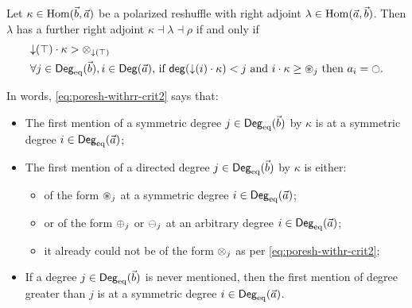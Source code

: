 \documentclass[a4paper]{memoir}
\begin{document}
\begin{theorem} \label{thm:poresh-withrr}
	Let $\kappa \in {\mathrm{Hom}}(\vec b, \vec a)$ be a polarized reshuffle with right adjoint $\lambda \in {\mathrm{Hom}}(\vec a, \vec b)$.
	Then $\lambda$ has a further right adjoint $\kappa \dashv \lambda \dashv \rho$ if and only if
	\begin{align}
		&\predeg(\top) \cdot \kappa > \mixpol_{\predeg(\top)} \label{eq:poresh-withrr-crit1} \\
		&\text{$\forall j \in \Degeq(\vec b), i \in \Deg(\vec a)$, if $\getdeg(\predeg(i) \cdot \kappa) < j$ and $i \cdot \kappa \geq \isopol_j$ then $a_i = \npolar$.} \label{eq:poresh-withrr-crit2}
	\end{align}
\end{theorem}
In words, \cref{eq:poresh-withrr-crit2} says that:
\begin{itemize}
	\item The first mention of a symmetric degree $j \in {\mathsf{Deg}_{\mathrm{eq}}}(\vec b)$ by $\kappa$ is at a symmetric degree $i \in {\mathsf{Deg}_{\mathrm{eq}}}(\vec a)$;
	\item The first mention of a directed degree $j \in {\mathsf{Deg}_{\mathrm{eq}}}(\vec b)$ by $\kappa$ is either:
	\begin{itemize}
		\item of the form ${\oast}_j$ at a symmetric degree $i \in {\mathsf{Deg}_{\mathrm{eq}}}(\vec a)$;
		\item or of the form ${\oplus}_j$ or ${\ominus}_j$ at an arbitrary degree $i \in {\mathsf{Deg}_{\mathrm{eq}}}(\vec a)$;
		\item it already could not be of the form ${\otimes}_j$ as per \cref{eq:poresh-withr-crit2};
	\end{itemize}
	\item If a degree $j \in {\mathsf{Deg}_{\mathrm{eq}}}(\vec b)$ is never mentioned, then the first mention of degree greater than $j$ is at a symmetric degree $i \in {\mathsf{Deg}_{\mathrm{eq}}}(\vec a)$.
\end{itemize}
\end{document}
